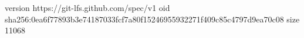 version https://git-lfs.github.com/spec/v1
oid sha256:0ea6f77893b3e74187033fcf7a80f15246955932271f409c85c4797d9ea70c08
size 11068
